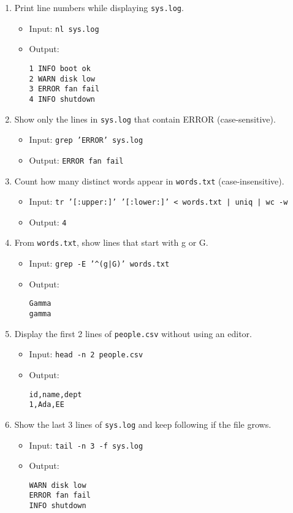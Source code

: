 \begin{enumerate}
\item Print line numbers while displaying \texttt{sys.log}.
\begin{itemize}
\item Input: \texttt{nl sys.log}
\item Output:
\begin{verbatim}
1 INFO boot ok
2 WARN disk low
3 ERROR fan fail
4 INFO shutdown
\end{verbatim}
\end{itemize}

\item Show only the lines in \texttt{sys.log} that contain ERROR (case-sensitive).
\begin{itemize}
\item Input: \texttt{grep 'ERROR' sys.log}
\item Output: \texttt{ERROR fan fail}
\end{itemize}

\item Count how many distinct words appear in \texttt{words.txt} (case-insensitive).
\begin{itemize}
\item Input: \texttt{tr '[:upper:]' '[:lower:]' < words.txt | uniq | wc -w}
\item Output: \texttt{4}
\end{itemize}

\item From \texttt{words.txt}, show lines that start with g or G.
\begin{itemize}
\item Input: \texttt{grep -E '\^{}(g|G)' words.txt}
\item Output:
\begin{verbatim}
Gamma
gamma
\end{verbatim}
\end{itemize}

\item Display the first 2 lines of \texttt{people.csv} without using an editor.
\begin{itemize}
\item Input: \texttt{head -n 2 people.csv}
\item Output:
\begin{verbatim}
id,name,dept
1,Ada,EE
\end{verbatim}
\end{itemize}

\item Show the last 3 lines of \texttt{sys.log} and keep following if the file grows.
\begin{itemize}
\item Input: \texttt{tail -n 3 -f sys.log}
\item Output:
\begin{verbatim}
WARN disk low
ERROR fan fail
INFO shutdown
\end{verbatim}
\end{itemize}
\end{enumerate}

